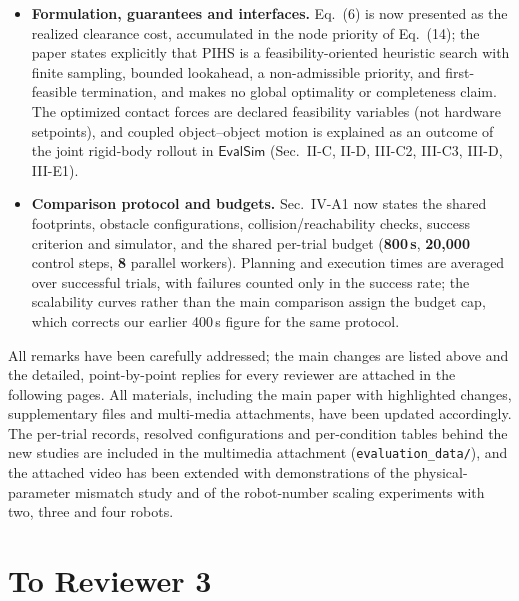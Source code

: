 \documentclass[11pt]{article}
\begin{document}
\begin{itemize}
\item \textbf{Formulation, guarantees and interfaces.} Eq.~(6) is now presented
as the realized clearance cost, accumulated in the node priority of Eq.~(14); the paper states explicitly that PIHS
is a feasibility-oriented heuristic search with finite sampling, bounded
lookahead, a non-admissible priority, and first-feasible termination, and makes
no global optimality or completeness claim. The optimized contact forces are
declared feasibility variables (not hardware setpoints), and coupled
object--object motion is explained as an outcome of the joint rigid-body
rollout in $\mathsf{EvalSim}$ (Sec.~II-C, II-D, III-C2, III-C3, III-D, III-E1).

\item \textbf{Comparison protocol and budgets.} Sec.~IV-A1 now states the
shared footprints, obstacle configurations, collision/reachability checks,
success criterion and simulator, and the shared per-trial budget
(\textbf{800\,s}, \textbf{20{,}000} control steps, \textbf{8} parallel workers).
Planning and execution times are averaged over successful trials, with failures
counted only in the success rate; the scalability curves rather than the main comparison assign the budget cap,
which corrects our earlier 400\,s figure for the same protocol.
\end{itemize}

\indent All remarks have been carefully addressed; the main changes are listed above and
the detailed, point-by-point replies for every reviewer are attached in the
following pages. All materials, including the main paper with highlighted
changes, supplementary files and multi-media attachments, have been updated
accordingly. The per-trial records, resolved configurations and per-condition tables behind the new studies are included in the multimedia attachment
(\texttt{evaluation\_data/}), and the attached video has been extended with
demonstrations of the physical-parameter mismatch study and of the robot-number scaling
experiments with two, three and four robots.


\newpage
\section*{To Reviewer 3}
\end{document}
